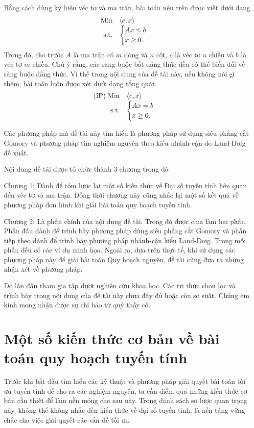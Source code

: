 \documentclass[12pt,a4paper]{report}
\begin{document}
Bằng cách dùng ký hiệu véc tơ và ma trận, bài toán nêu trên được viết dưới dạng 
$$
\begin{array}{rl}
{\rm Min}& \langle c,x \rangle \\
{\rm s.t.}& 
\begin{cases}Ax \le b\\
 x\ge 0.
 \end{cases}
\end{array}
$$
Trong đó, cho trước $A$ là ma trận có $m$ dòng và $n$ cột, $c$ là véc tơ $n$ chiều và $b$ là véc tơ $m$ chiều. Chú ý rằng, các ràng buộc bất đẳng thức đều có thể biến đổi về ràng buộc đẳng thức. Vì thế trong nội dung của đề tài này, nếu không nói gì thêm, bài toán luôn được xét dưới dạng tổng quát
$$
\begin{array}{rl}
{\rm (IP) \; Min}& \langle c,x \rangle \\
{\rm s.t.}& 
\begin{cases}Ax = b\\
 x\ge 0.
 \end{cases}
\end{array}
$$

Các phương pháp mà đề tài này tìm hiểu là phương pháp sử dụng siêu phẳng cắt Gomory và phương pháp tìm nghiệm nguyên theo kiểu nhánh-cận do Land-Doig đề xuất. 

Nội dung đề tài được tổ chức thành 3 chương trong đó 

Chương 1; Dành để tóm lược lại một số kiến thức về Đại số tuyến tính liên quan đến véc tơ và ma trận. Đồng thời chương này cũng nhắc lại một số kết quả về phương pháp đơn hình khi giải bài toán quy hoạch tuyến tính.

Chương 2: Là phần chính của nội dung đề tài. Trong đó được chia làm hai phần. Phần đầu dành để trình bày phương pháp dùng siêu phẳng cắt Gomory và phần tiếp theo dành để trình bày phương pháp nhánh-cận kiểu Land-Doig. Trong mỗi phần đều có các ví dụ minh họa. Ngoài ra, dựa trên thực tế, khi sử dụng các phương pháp này để giải bài toán Quy hoạch nguyên, đề tài cũng đưa ra những nhận xét về phương pháp.

Do lần đầu tham gia tập dượt nghiên cứu khoa học. Các tri thức chọn lọc và trình bày trong nội dung của đề tài này chưa đầy đủ hoặc còn sơ suất. Chúng em kính mong nhận được sự chỉ bảo từ quý thầy cô.

\newpage
\renewcommand{\baselinestretch}{1.2}
 
\chapter{Một số kiến thức cơ bản về bài toán quy hoạch tuyến tính}
Trước khi bắt đầu tìm hiểu các kỹ thuật và phương pháp giải quyết bài toán tối ưu tuyến tính để cho ra các nghiệm nguyên, ta cần điểm qua những kiến thức cơ bản cần thiết để làm nền móng cho sau này. Trong danh sách sơ lược quan trọng này, không thể không nhắc đến kiến thức về đại số tuyến tính, là nền tảng vững chắc cho việc giải quyết các vấn đề tối ưu.
\end{document}
